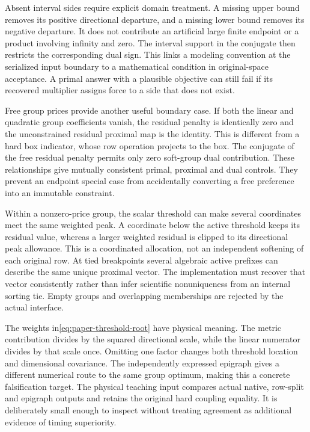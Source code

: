 Absent interval sides require explicit domain treatment. A missing upper
bound removes its positive directional departure, and a missing lower
bound removes its negative departure. It does not contribute an artificial
large finite endpoint or a product involving infinity and zero. The
interval support in the conjugate then restricts the corresponding dual
sign. This links a modeling convention at the serialized input boundary
to a mathematical condition in original-space acceptance. A primal answer
with a plausible objective can still fail if its recovered multiplier
assigns force to a side that does not exist.

Free group prices provide another useful boundary case. If both the
linear and quadratic group coefficients vanish, the residual penalty
is identically zero and the unconstrained residual proximal map is the
identity. This is different from a hard box indicator, whose row operation
projects to the box. The conjugate of the free residual penalty permits
only zero soft-group dual contribution. These relationships give mutually
consistent primal, proximal and dual controls. They prevent an endpoint
special case from accidentally converting a free preference into an
immutable constraint.

Within a nonzero-price group, the scalar threshold can make several
coordinates meet the same weighted peak. A coordinate below the active
threshold keeps its residual value, whereas a larger weighted residual
is clipped to its directional peak allowance. This is a coordinated
allocation, not an independent softening of each original row. At tied
breakpoints several algebraic active prefixes can describe the same
unique proximal vector. The implementation must recover that vector
consistently rather than infer scientific nonuniqueness from an internal
sorting tie. Empty groups and overlapping memberships are rejected by
the actual interface.

The weights in\eqref{eq:paper-threshold-root} have physical meaning.
The metric contribution divides by the squared directional scale,
while the linear numerator divides by that scale once. Omitting one
factor changes both threshold location and dimensional covariance.
The independently expressed epigraph gives a different numerical route
to the same group optimum, making this a concrete falsification target.
The physical teaching input compares actual native, row-split and
epigraph outputs and retains the original hard coupling equality.
It is deliberately small enough to inspect without treating agreement
as additional evidence of timing superiority.

